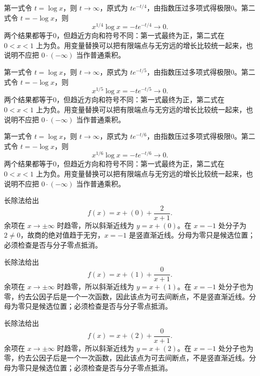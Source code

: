 \documentclass[12pt,fontset=fandol]{ctexart}
\begin{document}
\begin{solve}\label{ans:c4q16}
第一式令 $t=\log x$，则 $t\to\infty$，原式为 $te^{-t/4}$，由指数压过多项式得极限0。第二式令 $t=-\log x$，则
\[
x^{1/4}\log x=-te^{-t/4}\longrightarrow0.
\]
两个结果都等于0，但趋近方向和符号不同：第一式最终为正，第二式在 $0<x<1$ 上为负。用变量替换可以把有限端点与无穷远的增长比较统一起来，也说明不应把 $0\cdot(-\infty)$ 当作普通乘积。
\end{solve}

\begin{solve}\label{ans:c4q17}
第一式令 $t=\log x$，则 $t\to\infty$，原式为 $te^{-t/5}$，由指数压过多项式得极限0。第二式令 $t=-\log x$，则
\[
x^{1/5}\log x=-te^{-t/5}\longrightarrow0.
\]
两个结果都等于0，但趋近方向和符号不同：第一式最终为正，第二式在 $0<x<1$ 上为负。用变量替换可以把有限端点与无穷远的增长比较统一起来，也说明不应把 $0\cdot(-\infty)$ 当作普通乘积。
\end{solve}

\begin{solve}\label{ans:c4q18}
第一式令 $t=\log x$，则 $t\to\infty$，原式为 $te^{-t/6}$，由指数压过多项式得极限0。第二式令 $t=-\log x$，则
\[
x^{1/6}\log x=-te^{-t/6}\longrightarrow0.
\]
两个结果都等于0，但趋近方向和符号不同：第一式最终为正，第二式在 $0<x<1$ 上为负。用变量替换可以把有限端点与无穷远的增长比较统一起来，也说明不应把 $0\cdot(-\infty)$ 当作普通乘积。
\end{solve}

\begin{solve}\label{ans:c4q19}
长除法给出
\[
f(x)=x+(0)+\frac{2}{x+1}.
\]
余项在 $x\to\pm\infty$ 时趋零，所以斜渐近线为 $y=x+(0)$。在 $x=-1$ 处分子为 $2\ne0$，故商的绝对值趋于无穷，$x=-1$ 是竖直渐近线。分母为零只是候选位置；必须检查是否与分子零点抵消。
\end{solve}

\begin{solve}\label{ans:c4q20}
长除法给出
\[
f(x)=x+(1)+\frac{0}{x+1}.
\]
余项在 $x\to\pm\infty$ 时趋零，所以斜渐近线为 $y=x+(1)$。在 $x=-1$ 处分子也为零，约去公因子后是一个一次函数，因此该点为可去间断点，不是竖直渐近线。分母为零只是候选位置；必须检查是否与分子零点抵消。
\end{solve}

\begin{solve}\label{ans:c4q21}
长除法给出
\[
f(x)=x+(2)+\frac{0}{x+1}.
\]
余项在 $x\to\pm\infty$ 时趋零，所以斜渐近线为 $y=x+(2)$。在 $x=-1$ 处分子也为零，约去公因子后是一个一次函数，因此该点为可去间断点，不是竖直渐近线。分母为零只是候选位置；必须检查是否与分子零点抵消。
\end{solve}
\end{document}
